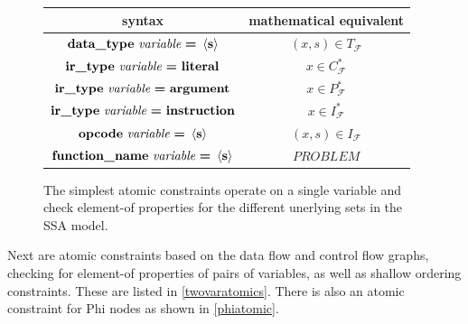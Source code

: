 \begin{figure}[h]
  \centering
  \begin{tabular}{|c|c|}
    \hline
    syntax & mathematical equivalent \\
    \hline
    \hline
    $\text{\bf data\_type}\ \text{\it variable}\ \text{\bf =}\ \left<\text{\bf s}\right>$ &  $(x,s)\in T_\mathcal F$\\
    \hline
    $\text{\bf ir\_type}\ \text{\it variable}\ \text{\bf =}\ \text{\bf literal}$ &  $x\in C_\mathcal F^*$\\
    $\text{\bf ir\_type}\ \text{\it variable}\ \text{\bf =}\ \text{\bf argument}$ & $x\in P_\mathcal F^*$\\
    $\text{\bf ir\_type}\ \text{\it variable}\ \text{\bf =}\ \text{\bf instruction}$ & $x\in I_\mathcal F^*$\\
    \hline
    $\text{\bf opcode}\ \text{\it variable}\ \text{\bf =}\ \left<\text{\bf s}\right>$ & $(x,s)\in I_\mathcal F$\\
    \hline
    $\text{\bf function\_name}\ \text{\it variable}\ \text{\bf =}\ \left<\text{\bf s}\right>$ & $PROBLEM$\\
    \hline
  \end{tabular}
  \caption{The simplest atomic constraints operate on a single variable and
           check element-of properties for the different unerlying sets
           in the SSA model.}
  \label{onevaratomics}
\end{figure}

    \noindent
    Next are atomic constraints based on the data flow and
    control flow graphs, checking for element-of properties of pairs of
    variables, as well as shallow ordering constraints.
    These are listed in \autoref{twovaratomics}.
    There is also an atomic constraint for Phi nodes as shown in
    \autoref{phiatomic}.

